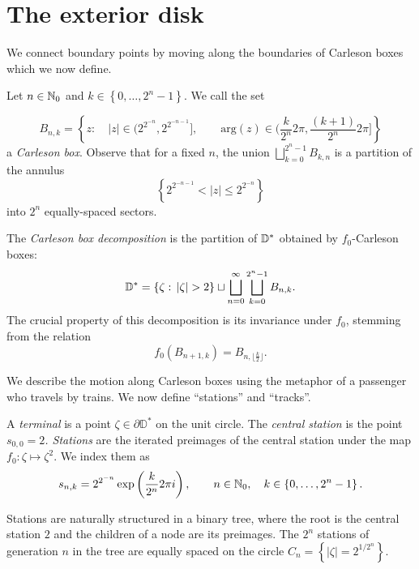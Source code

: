 \section{The exterior disk}

\begin{comment}
The exterior $\D^{*}=\left\{ \left|z\right|>1\right\} $ of the unit
disk is trivially quasiconvex by connecting points along the perimeter of the circle. However, these paths follow the boundary too closely and their length would blow up if we transport them to the exterior of $\mathcal{J}(f_{c})$, $c\neq0$, via the Riemann map. Instead,
\end{comment}

We connect boundary points by moving along the boundaries of Carleson boxes which we now define.
\begin{definition}
Let $n\in\mathbb{N}_{0}$ and $k\in\left\{ 0,\ldots,2^{n}-1\right\} $. We
call the set

\[
B_{n,k}=\left\{ z:\quad\left|z\right|\in\biggl(2^{2^{-n}},2^{2^{-n-1}}\biggl],\qquad\mathrm{arg}(z)\in\biggl(\frac{k}{2^{n}}2\pi,\frac{(k+1)}{2^{n}}2\pi\biggl]\right\} 
\]
a \emph{Carleson box}.
Observe that for a fixed $n$, the union $\bigsqcup_{k=0}^{2^{n}-1}B_{k,n}$
is a partition of the annulus 
\[
\left\{ 2^{2^{-n-1}}<\left|z\right|\leq2^{2^{-n}}\right\} 
\]
 into $2^{n}$ equally-spaced sectors.
 
The \emph{Carleson box decomposition} is the partition of $\mathbb{D}^{*}$ obtained by $f_{0}$-Carleson
boxes:
\[
\D^{*}=\left\{ \zeta:\,\left|\zeta\right|>2\right\} \sqcup\bigsqcup_{n=0}^{\infty}\bigsqcup_{k=0}^{2^{n}-1}B_{n,k}.
\]
The crucial property of this decomposition is its invariance under $f_{0}$,
stemming from the relation
\begin{equation*}
f_{0}\left(B_{n+1,k}\right)=B_{n,\lfloor\frac{k}{2}\rfloor}.
\end{equation*}
\end{definition}

We describe the motion along Carleson boxes using the metaphor of a passenger who travels by trains. 
We now define \enquote{stations} and \enquote{tracks}.

\begin{definition}
A \emph{terminal} is a point $\zeta \in \partial \mathbb D^*$ on the unit circle.
The \emph{central station} is the point\emph{ $s_{0,0}=2$. Stations
}are the iterated preimages of the central station under the map $f_{0}:\zeta\mapsto \zeta^{2}$.
We index them as 
\[
s_{n,k}=2^{2^{-n}}\exp\left(\frac{k}{2^{n}}2\pi i\right),\qquad n\in\mathbb{N}_{0},\quad k\in\left\{ 0,\ldots,2^{n}-1\right\} .
\]

Stations are naturally structured in a binary tree, where the root
is the central station $2$ and the children of a node are its preimages.
The $2^{n}$ stations of generation $n$ in the tree are equally spaced
on the circle $C_{n}=\left\{ \left|\zeta\right|=2^{1/2^{n}}\right\} $. 


\end{definition}

